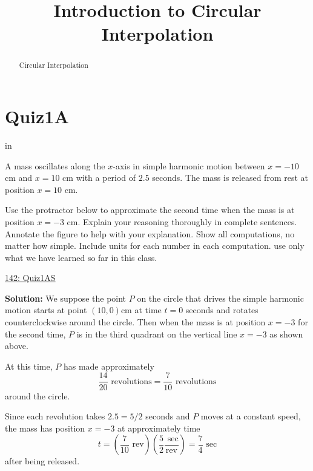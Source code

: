 \documentclass{ximera}
\title{Introduction to Circular Interpolation}
\newcommand{\pskip}{\vskip 0.1 in}
\begin{document}
\begin{abstract}
Circular Interpolation
\end{abstract}
\maketitle

\section{Quiz1A}

\pskip



A mass oscillates along the $x$-axis in simple harmonic motion between $x=-10$ cm and $x=10$ cm with a period of $2.5$ seconds. The mass is released from rest at position $x=10$ cm.

Use the protractor below to approximate the second time when the mass is at position $x=-3$ cm. Explain your reasoning thoroughly in complete sentences. Annotate the figure to help with your explanation. Show all computations, no matter how simple. Include units for each number in each computation. use only what we have learned so far in this class.

\begin{onlineOnly}
    \begin{center}
\end{center}
\end{onlineOnly}

\href{https://www.desmos.com/calculator/5fuh8n6ef1}{142: Quiz1AS}


{\bf Solution:} We suppose the point $P$ on the circle that drives the simple harmonic motion starts at point $(10,0)$cm at time $t=0$ seconds and rotates counterclockwise around the circle. Then when the mass is at position $x=-3$ for the second time, $P$ is in the third quadrant on the vertical line $x=-3$ as shown above.

At this time, $P$ has made approximately
\[
     \frac{14}{20}\text{ revolutions} = \frac{7}{10} \text{ revolutions}
\]
around the circle. 

Since each revolution takes $2.5 = 5/2$ seconds and $P$ moves at a constant speed, the mass has position $x=-3$ at approximately time
\[
 t = \left( \frac{7}{10} \text{ rev}  \right) \left(\frac{5}{2} \frac{\text{ sec}}{\text{rev}}  \right) = \frac{7}{4} \text{ sec}
\]
after being released.
\end{document}

